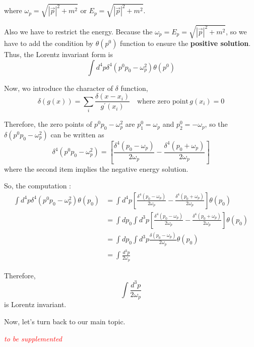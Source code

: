 \documentclass[12pt,openany]{book}
\begin{document}
	where $\omega_p=\sqrt{|\vec{p}|^2+m^2}$ or $E_p=\sqrt{|\vec{p}|^2+m^2}$.
	\par
	Also we have to restrict the energy. 
	Because the $\omega_p=E_p=\sqrt{|\vec{p}|^2+m^2}$, so we have to add the condition by $\theta(p^0)$ function to ensure the \textbf{positive solution}.
	Thus, the Lorentz invariant form is 
	\begin{equation}
		\int d^4p\delta^4(p^0p_0-\omega_p^2)\theta(p^0)
	\end{equation}
    \par 
    Now, wo introduce the character of $\delta$ function,
    \begin{equation}
    	\delta\left(g(x)\right)=\sum_i\frac{\delta(x-x_i)}{g^\prime(x_i)}\quad\text{where zero point}\,g(x_i)=0
    \end{equation}\par 
    Therefore, the zero points of $p^0p_0-\omega_p^2$ are $p^0_1=\omega_p$ and $p^0_2=-\omega_p$, so the $\delta(p^0p_0-\omega_p^2)$ can be written as 
    \begin{equation}
    	\delta^4(p^0p_0-\omega_p^2)=\left[\frac{\delta^4(p_0-\omega_p)}{2\omega_p}-\frac{\delta^4(p_0+\omega_p)}{2\omega_p}\right]
    \end{equation}
    where the second item implies the negative energy solution.\par 
    So, the computation :
    \begin{equation}
    	\begin{aligned}
    			\int d^4p\delta^4(p^0p_0-\omega_p^2)\theta(p_0)&=\int d^4p \left[\frac{\delta^4(p_0-\omega_p)}{2\omega_p}-\frac{\delta^4(p_0+\omega_p)}{2\omega_p}\right]\theta(p_0)\\
    			                                               &=\int dp_0\int d^3p \left[\frac{\delta^4(p_0-\omega_p)}{2\omega_p}-\frac{\delta^4(p_0+\omega_p)}{2\omega_p}\right]\theta(p_0)\\
    			                                               &=\int dp_0\int d^3p\frac{\delta(p_0-\omega_p)}{2\omega_p}\theta(p_0)\\
    			                                               &=\int \frac{d^3p}{2\omega_p}
    	\end{aligned}
    \end{equation}\par 
    Therefore,
    \begin{equation}
    	\int \frac{d^3p}{2\omega_p}
    \end{equation}
    is Lorentz invariant.\par 
    Now, let's turn back to our main topic.
    \begin{center}
    	\textcolor{red}{\textit{to be supplemented}}
    \end{center}
	
\end{document}
